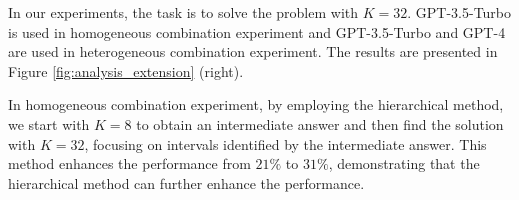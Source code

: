 


In our experiments, the task is to solve the problem with $K=32$. GPT-3.5-Turbo is used in homogeneous combination experiment and GPT-3.5-Turbo and GPT-4 are used in heterogeneous combination experiment. The results are presented in Figure \ref{fig:analysis_extension} (right). %

In homogeneous combination experiment, by employing the hierarchical method, we start with $K=8$ to obtain an intermediate answer and then find the solution with $K=32$, focusing on intervals identified by the intermediate answer. This method enhances the performance from $21\%$ to $31\%$, demonstrating that the hierarchical method can further enhance the performance.

